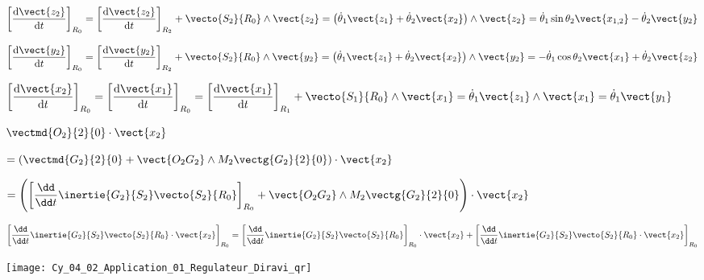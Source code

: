 \begin{corrige}
$\left[\dfrac{\text{d} \vect{z_2}}{\text{d} t}\right]_{R_0}
=\left[\dfrac{\text{d} \vect{z_2}}{\text{d} t}\right]_{R_2} + \vecto{S_2}{R_0}\wedge\vect{z_2}
= \left( \dot{\theta}_1 \vect{z_1}+\dot{\theta}_2 \vect{x_2}\right) \wedge \vect{z_2}
= \dot{\theta}_1 \sin\theta_2 \vect{x_{1,2}} -\dot{\theta}_2 \vect{y_2} 
$


$\left[\dfrac{\text{d} \vect{y_2}}{\text{d} t}\right]_{R_0}
=\left[\dfrac{\text{d} \vect{y_2}}{\text{d} t}\right]_{R_2} + \vecto{S_2}{R_0}\wedge\vect{y_2}
= \left( \dot{\theta}_1 \vect{z_1}+\dot{\theta}_2 \vect{x_2}\right) \wedge \vect{y_2}
= -\dot{\theta}_1 \cos\theta_2\vect{x_1}+\dot{\theta}_2 \vect{z_2}
$


$\left[\dfrac{\text{d} \vect{x_2}}{\text{d} t}\right]_{R_0}
=\left[\dfrac{\text{d} \vect{x_1}}{\text{d} t}\right]_{R_0}
=\left[\dfrac{\text{d} \vect{x_1}}{\text{d} t}\right]_{R_1} + \vecto{S_1}{R_0}\wedge\vect{x_1}
=\dot{\theta}_1 \vect{z_1} \wedge  \vect{x_1}
=\dot{\theta}_1 \vect{y_1}$




\end{corrige}
\else
\fi


\ifprof
\begin{corrige}


$\vectmd{O_2}{2}{0}\cdot \vect{x_2}$

$= \left( \vectmd{G_2}{2}{0}+\vect{O_2G_2}\wedge M_2\vectg{G_2}{2}{0}\right)\cdot \vect{x_2}$

$= \left( \left[\dfrac{\dd}{\dd t}\inertie{G_2}{S_2}\vecto{S_2}{R_0}\right]_{R_0}
+\vect{O_2G_2}\wedge M_2\vectg{G_2}{2}{0}\right)\cdot \vect{x_2}$

$\left[\dfrac{\dd}{\dd t}\inertie{G_2}{S_2}\vecto{S_2}{R_0} \cdot \vect{x_2} \right]_{R_0}
=\left[\dfrac{\dd}{\dd t}\inertie{G_2}{S_2}\vecto{S_2}{R_0}  \right]_{R_0}\cdot \vect{x_2}+\left[\dfrac{\dd}{\dd t}\inertie{G_2}{S_2}\vecto{S_2}{R_0} \cdot \vect{x_2} \right]_{R_0}$
\end{corrige}
\else
\fi


\ifprof
\else
\begin{marginfigure}
\centering
\texttt{[image: Cy\_04\_02\_Application\_01\_Regulateur\_Diravi\_qr]}
\end{marginfigure}
\fi


